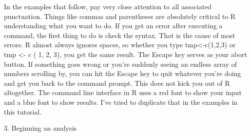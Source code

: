 In the examples that follow, pay very close attention to all associated punctuation. Things like commas and parentheses are absolutely critical to R understanding what you want to do. If you get an error after executing a command, the first thing to do is check the syntax. That is the cause of most errors. R almost always ignores spaces, so whether you type tmp<-c(1,2,3) or tmp <- c ( 1, 2, 3), you get the same result. 
The Escape key serves as your abort button. If something goes wrong or you're suddenly seeing an endless array of numbers scrolling by, you can hit the Escape key to quit whatever you're doing and get you back to the command prompt. This does not kick you out of R altogether. 
The command line interface in R uses a red font to show your input and a blue font to show results. I've tried to duplicate that in the examples in this tutorial. 

3. Beginning an analysis


